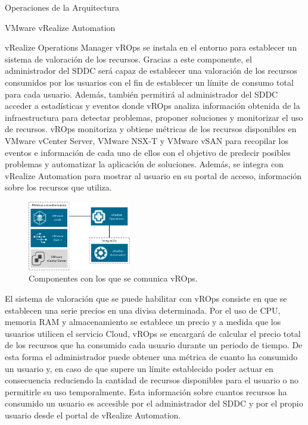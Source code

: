 \begin{subsection}{Operaciones de la Arquitectura}
\begin{subsubsection}{VMware vRealize Automation}
    \end{subsubsection}
    \begin{subsubsection}{vRealize Operations Manager}
        vROps se instala en el entorno para establecer un sistema de valoración de los recursos. Gracias a este componente, el administrador del SDDC será capaz de establecer una valoración de los recursos consumidos por los usuarios con el fin de establecer un límite de consumo total para cada usuario. Además, también permitirá al administrador del SDDC acceder a estadísticas y eventos donde vROps analiza información obtenida de la infraestructura para detectar problemas, proponer soluciones y monitorizar el uso de recursos. vROps monitoriza y obtiene métricas de los recursos disponibles en VMware vCenter Server, VMware NSX-T y VMware vSAN para recopilar los eventos e información de cada uno de ellos con el objetivo de predecir posibles problemas y automatizar la aplicación de soluciones. Además, se integra con vRealize Automation para mostrar al usuario en su portal de acceso, información sobre los recursos que utiliza.
        \\
        \begin{figure}[h]
            \centering
            \includegraphics[width=0.4\textwidth]{imaxes/pruebaconcepto/vrealize/estructura-vrops.png}
            \caption{Componentes con los que se comunica vROps.}
            \label{fig:vrops-components}
        \end{figure}
        \FloatBarrier
        El sistema de valoración que se puede habilitar con vROps consiste en que se establecen una serie precios en una divisa determinada. Por el uso de CPU, memoria RAM y almacenamiento se establece un precio y a medida que los usuarios utilicen el servicio Cloud, vROps se encargará de calcular el precio total de los recursos que ha consumido cada usuario durante un periodo de tiempo. De esta forma el administrador puede obtener una métrica de cuanto ha consumido un usuario y, en caso de que supere un límite establecido poder actuar en consecuencia reduciendo la cantidad de recursos disponibles para el usuario o no permitirle su uso temporalmente. Esta información sobre cuantos recursos ha consumido un usuario es accesible por el administrador del SDDC y por el propio usuario desde el portal de vRealize Automation.

\end{subsubsection}
\end{subsection}

